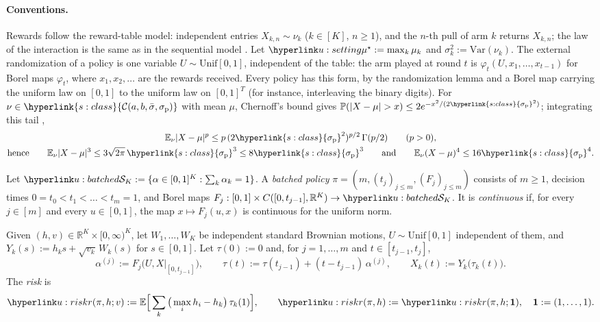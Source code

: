 \documentclass[11pt]{article}
\newcommand{\dt}[1]{\hypertarget{#1}{}}
\DeclareRobustCommand{\sy}[2]{{\hyperlink{#1}{#2}}}
\newcommand{\R}{\mathbb{R}}
\newcommand{\E}{\mathbb{E}}
\renewcommand{\P}{\mathbb{P}}
\newcommand{\1}{\mathbf{1}}
\newcommand{\Cab}{\sy{s:class}{\mathcal C(a,b,\bar\sigma,\sigma_{\mathrm p})}}
\newcommand{\sigp}{\sy{s:class}{\sigma_{\mathrm p}}}
\begin{document}
\paragraph{Conventions.}\dt{u:setting} Rewards follow the reward-table model: independent entries $X_{k,n}\sim\nu_k$ ($k\in[K]$, $n\ge1$), and the $n$-th pull
of arm $k$ returns $X_{k,n}$; the law of the interaction is the same as in the sequential model \citep[Sec.~4.6]{LS}. Let $\umus:=\max_k\mu_k$ and
$\sigma_k^2:=\mathrm{Var}(\nu_k)$. The external randomization of a policy is one variable $U\sim\mathrm{Unif}[0,1]$, independent of the table: the arm played
at round $t$ is $\varphi_t(U,x_1,\dots,x_{t-1})$ for Borel maps $\varphi_t$, where $x_1,x_2,\dots$ are the rewards received. Every policy has this form, by the
randomization lemma \citep[Lemma~3.22]{Kal02} and a Borel map carrying the uniform law on $[0,1]$ to the uniform law on $[0,1]^T$ (for instance, interleaving the binary digits). For $\nu\in\Cab$ with mean $\mu$, Chernoff's bound gives
$\P(|X-\mu|>x)\le2e^{-x^2/(2\sigp^2)}$; integrating this tail \citep[Lemma~1.4]{RH17},
\begin{equation}\label{eq:u-moments}
\begin{gathered}
\E_\nu|X-\mu|^p\le p\,(2\sigp^2)^{p/2}\,\Gamma(p/2)\qquad(p>0),\\
\text{hence}\qquad \E_\nu|X-\mu|^3\le3\sqrt{2\pi}\,\sigp^3\le8\sigp^3\qquad\text{and}\qquad\E_\nu(X-\mu)^4\le16\sigp^4 .
\end{gathered}
\end{equation}

\begin{definition}\label{def:u-batched}\dt{u:batched}\dt{u:risk}
Let $\uSimp:=\{\alpha\in[0,1]^K:\sum_k\alpha_k=1\}$. A \emph{batched policy} $\pi=(m,(t_j)_{j\le m},(F_j)_{j\le m})$ consists of $m\ge1$, decision times
$0=t_0<t_1<\dots<t_m=1$, and Borel maps $F_j:[0,1]\times C([0,t_{j-1}],\R^K)\to\uSimp$. It is \emph{continuous} if, for every $j\in[m]$ and every
$u\in[0,1]$, the map $x\mapsto F_j(u,x)$ is continuous for the uniform norm.

Given $(h,v)\in\R^K\times[0,\infty)^K$, let $W_1,\dots,W_K$ be independent standard Brownian motions, $U\sim\mathrm{Unif}[0,1]$ independent of them, and
$Y_k(s):=h_ks+\sqrt{v_k}\,W_k(s)$ for $s\in[0,1]$. Let $\tau(0):=0$ and, for $j=1,\dots,m$ and $t\in[t_{j-1},t_j]$,
\[
\alpha^{(j)}:=F_j\big(U,X|_{[0,t_{j-1}]}\big),\qquad \tau(t):=\tau(t_{j-1})+(t-t_{j-1})\,\alpha^{(j)},\qquad X_k(t):=Y_k\big(\tau_k(t)\big).
\]
The \emph{risk} is
\[
\urk(\pi,h;v):=\E\Big[\sum_k\big(\max_ih_i-h_k\big)\,\tau_k(1)\Big],\qquad \urk(\pi,h):=\urk(\pi,h;\mathbf 1),\quad \mathbf 1:=(1,\dots,1).
\]
\end{definition}
\end{document}
